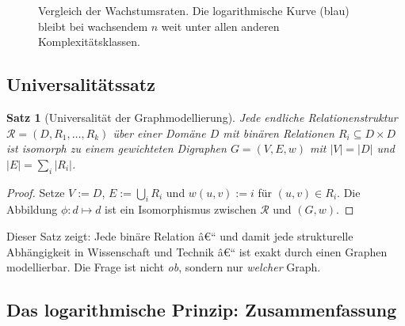 ﻿\documentclass[12pt,a4paper,twoside]{article}
\theoremstyle{definition}
\theoremstyle{plain}
\newtheorem{theorem}{Satz}[section]
\theoremstyle{remark}
\begin{document}
\begin{figure}[h]
  \centering
  \caption{Vergleich der Wachstumsraten.  Die logarithmische Kurve
           (blau) bleibt bei wachsendem $n$ weit unter allen anderen
           Komplexitätsklassen.}
  \label{fig:komplexitaet}
\end{figure}

\subsection{Universalitätssatz}

\begin{theorem}[Universalität der Graphmodellierung]
\label{thm:universal}
Jede endliche Relationenstruktur $\mathcal{R} = (D, R_1, \ldots, R_k)$
über einer Domäne $D$ mit binären Relationen $R_i \subseteq D \times D$
ist isomorph zu einem gewichteten Digraphen $G=(V,E,w)$ mit
$|V|=|D|$ und $|E|=\sum_i |R_i|$.
\end{theorem}

\begin{proof}
Setze $V := D$, $E := \bigcup_i R_i$ und $w(u,v) := i$ für
$(u,v) \in R_i$.  Die Abbildung $\phi: d \mapsto d$ ist ein
Isomorphismus zwischen $\mathcal{R}$ und $(G,w)$.
\end{proof}

\noindent
Dieser Satz zeigt: Jede binäre Relation â€“ und damit jede
strukturelle Abhängigkeit in Wissenschaft und Technik â€“ ist
exakt durch einen Graphen modellierbar.  Die Frage ist nicht
\emph{ob}, sondern nur \emph{welcher} Graph.

\subsection{Das logarithmische Prinzip: Zusammenfassung}
\end{document}

